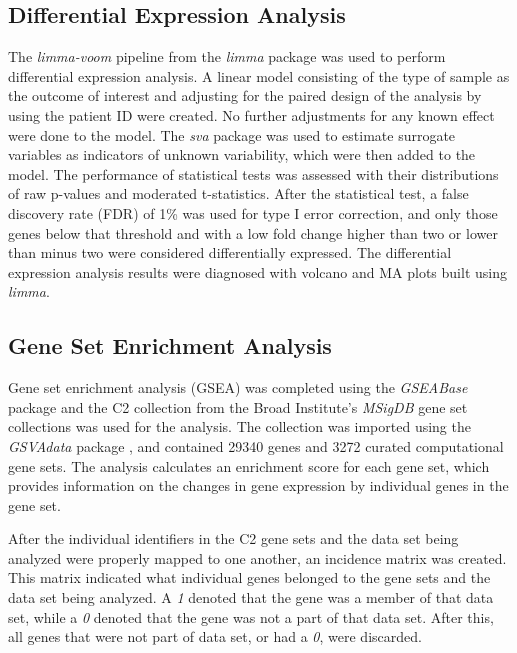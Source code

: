 \documentclass[9pt,twocolumn,twoside]{gsajnl}
\begin{document}
\subsection{Differential Expression Analysis}

The \textit{limma-voom} pipeline from the \textit{limma} package \citep{limma} was used to perform differential expression analysis. A linear model consisting of the type of sample as the outcome of interest and adjusting for the paired design of the analysis by using the patient ID were created. No further adjustments for any known effect were done to the model. The \textit{sva} package \citep{sva} was used to estimate surrogate variables as indicators of unknown variability, which were then added to the model. The performance of statistical tests was assessed with their distributions of raw p-values and moderated t-statistics. After the statistical test, a false discovery rate (FDR) of 1\% was used for type I error correction, and only those genes below that threshold and with a low fold change higher than two or lower than minus two were considered differentially expressed. The differential expression analysis results were diagnosed with volcano and MA plots built using \textit{limma}.

\subsection{Gene Set Enrichment Analysis}

Gene set enrichment analysis (GSEA) was completed using the \textit{GSEABase} package \citep{GSEA} and the C2 collection from the Broad Institute's \textit{MSigDB} gene set collections was used for the analysis. The collection was imported using the \textit{GSVAdata} package \citep{GSVAdata}, and contained 29340 genes and 3272 curated computational gene sets. The analysis calculates an enrichment score for each gene set, which provides information on the changes in gene expression by individual genes in the gene set.

After the individual identifiers in the C2 gene sets and the data set being analyzed were properly mapped to one another, an incidence matrix was created. This matrix indicated what individual genes belonged to the gene sets and the data set being analyzed. A \textit{1} denoted that the gene was a member of that data set, while a \textit{0} denoted that the gene was not a part of that data set. After this, all genes that were not part of data set, or had a \textit{0}, were discarded. 
\end{document}

